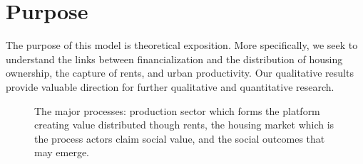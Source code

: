 \section{Purpose}
The purpose of this model is \gls{theoretical exposition}. More specifically, we seek to understand the links between financialization and  the distribution of housing ownership, the capture of rents, and  urban productivity. %
Our qualitative results provide valuable direction for further qualitative and quantitative research.
\begin{figure}[h!tb]
\centering
{}
\caption[The platform, the process, and the outcomes]{The major processes: production sector which forms the platform creating value distributed though rents, the housing market which is the process actors claim social value, and the social outcomes that may emerge. %
}
\label{fig:outcomes}
\end{figure}



